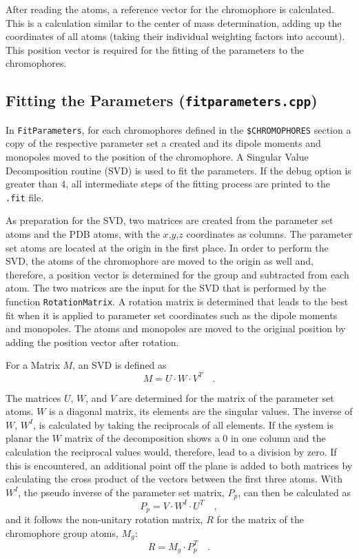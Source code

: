 \documentclass[11pt, letterpaper]{article}
\begin{document}
After reading the atoms, a reference vector for the chromophore is calculated. This is a calculation similar to the center of mass determination, adding up the coordinates of all atoms (taking their individual weighting factors into account). This position vector is required for the fitting of the parameters to the chromophores.




\subsection{Fitting the Parameters (\texttt{fitparameters.cpp})}

In \verb'FitParameters', for each chromophores defined in the \verb'$CHROMOPHORES' section a copy of the respective parameter set a created and its dipole moments and monopoles moved to the position of the chromophore. A Singular Value Decomposition routine (SVD) is used to fit the parameters. If the debug option is greater than 4, all intermediate steps of the fitting process are printed to the \verb'.fit' file.

As preparation for the SVD, two matrices are created from the parameter set atoms and the PDB atoms, with the $x$,$y$,$z$ coordinates as columns. The parameter set atoms are located at the origin in the first place. In order to perform the SVD, the atoms of the chromophore are moved to the origin as well and, therefore, a position vector is determined for the group and subtracted from each atom. The two matrices are the input for the SVD that is performed by the function \verb'RotationMatrix'. A rotation matrix is determined that leads to the best fit when it is applied to parameter set coordinates such as the dipole moments and monopoles. The atoms and monopoles are moved to the original position by adding the position vector after rotation.

For a Matrix $M$, an SVD is defined as
\begin{equation*}
M = U \cdot W \cdot V^T \quad .
\end{equation*}

The matrices $U$, $W$, and $V$ are determined for the matrix of the parameter set atoms. $W$ is a diagonal matrix, its elements are the singular values. The inverse of $W$, $W^I$, is calculated by taking the reciprocals of all elements. If the system is planar the $W$ matrix of the decomposition shows a 0 in one column and the calculation the reciprocal values would, therefore, lead to a division by zero. If this is encountered, an additional point off the plane is added to both matrices by calculating the cross product of the vectors between the first three atoms. With $W^I$, the pseudo inverse of the parameter set matrix, $P_p$, can then be calculated as
\begin{equation*}
P_p = V \cdot W^I \cdot U^T \quad ,
\end{equation*}
and it follows the non-unitary rotation matrix, $R$ for the matrix of the chromophore group atoms, $M_g$:
\begin{equation*}
R = M_g \cdot P_p^T \quad .
\end{equation*}
 
\end{document}
